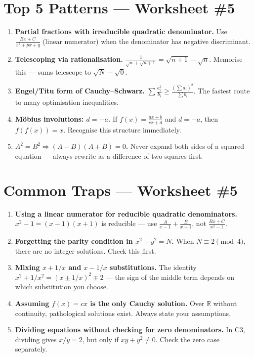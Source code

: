 \documentclass[11pt,a4paper]{article}
\begin{document}
\section*{Top 5 Patterns --- Worksheet \#5}
\begin{enumerate}[leftmargin=2em,itemsep=4pt]
  \item \textbf{Partial fractions with irreducible quadratic denominator.} Use $\frac{Bx+C}{x^2+px+q}$ (linear numerator) when the denominator has negative discriminant. 
  \item \textbf{Telescoping via rationalisation.} $\frac{1}{\sqrt{n}+\sqrt{n+1}}=\sqrt{n+1}-\sqrt{n}$. Memorise this --- sums telescope to $\sqrt{N}-\sqrt{0}$. 
  \item \textbf{Engel/Titu form of Cauchy--Schwarz.} $\sum\frac{a_i^2}{b_i}\geq\frac{(\sum a_i)^2}{\sum b_i}$. The fastest route to many optimisation inequalities. 
  \item \textbf{M\"{o}bius involutions: $d=-a$.} If $f(x)=\frac{ax+b}{cx+d}$ and $d=-a$, then $f(f(x))=x$. Recognise this structure immediately. 
  \item \textbf{$A^2=B^2 \Rightarrow (A-B)(A+B)=0$.} Never expand both sides of a squared equation --- always rewrite as a difference of two squares first. 
\end{enumerate}

\section*{Common Traps --- Worksheet \#5}
\begin{enumerate}[leftmargin=2em,itemsep=4pt]
  \item \textbf{Using a linear numerator for reducible quadratic denominators.} $x^2-1=(x-1)(x+1)$ is reducible --- use $\frac{A}{x-1}+\frac{B}{x+1}$, not $\frac{Bx+C}{x^2-1}$. 
  \item \textbf{Forgetting the parity condition in $x^2-y^2=N$.} When $N\equiv2\pmod4$, there are no integer solutions. Check this first. 
  \item \textbf{Mixing $x+1/x$ and $x-1/x$ substitutions.} The identity $x^2+1/x^2=(x\pm1/x)^2\mp2$ --- the sign of the middle term depends on which substitution you choose. 
  \item \textbf{Assuming $f(x)=cx$ is the only Cauchy solution.} Over $\mathbb{R}$ without continuity, pathological solutions exist. Always state your assumptions. 
  \item \textbf{Dividing equations without checking for zero denominators.} In C3, dividing gives $x/y=2$, but only if $xy+y^2\neq0$. Check the zero case separately. 
\end{enumerate}

\end{document}
